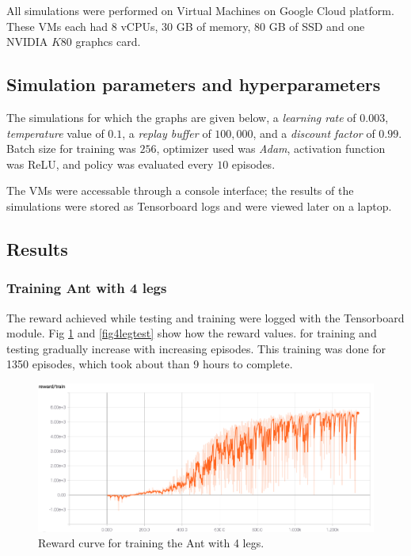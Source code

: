 \documentclass[conference]{IEEEtran}
\begin{document}
All simulations were performed on Virtual Machines on Google Cloud platform. These VMs each had $8$ vCPUs, $30$ GB of memory, $80$ GB of SSD and one NVIDIA $K80$ graphcs card.

\subsection{Simulation parameters and hyperparameters}
The simulations for which the graphs are given below, a \emph{learning rate} of $0.003$, \emph{temperature} value of $0.1$, a \emph{replay buffer} of $100,000$, and a \emph{discount factor} of $0.99$. Batch size for training was $256$, optimizer used was \emph{Adam}, activation function was ReLU, and policy was evaluated every $10$ episodes.

The VMs were accessable through a console interface; the results of the simulations were stored as Tensorboard logs and were viewed later on a laptop.

\subsection{Results}
\subsubsection{Training Ant with 4 legs}
The reward achieved while testing and training were logged with the Tensorboard module. Fig \ref{fig4legtrain} and \ref{fig4legtest} show how the reward values. for training and testing gradually increase with increasing episodes. This training was done for 1350 episodes, which took about than 9 hours to complete.


\begin{figure}[htbp]
\centerline{\includegraphics[width=\linewidth]{img/ant4-reward-train.png}}
\caption{Reward curve for training the Ant with 4 legs.}
\label{fig4legtrain}
\end{figure}
\end{document}

